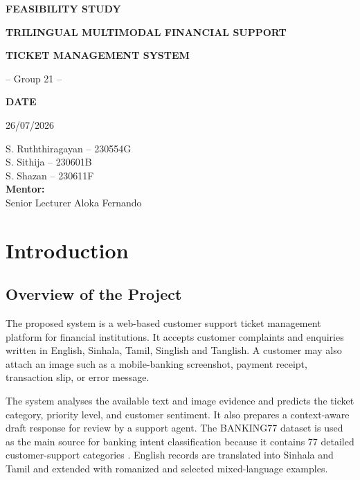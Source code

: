 \documentclass[11pt,a4paper]{article}
\begin{document}
\begin{titlepage}
\thispagestyle{empty}
\centering
\vspace*{3.8cm}

{\LARGE\bfseries FEASIBILITY STUDY\par}
\vspace{0.45cm}
{\Large\bfseries TRILINGUAL MULTIMODAL FINANCIAL SUPPORT\par}
{\Large\bfseries TICKET MANAGEMENT SYSTEM\par}
\vspace{0.35cm}
{\large -- Group 21 --\par}

\vfill

{\large\bfseries DATE\par}
{\large 26/07/2026\par}

\vfill

\begin{flushleft}
\large
S. Ruththiragayan -- 230554G\\
S. Sithija -- 230601B\\
S. Shazan -- 230611F\\[0.7cm]
\textbf{Mentor:}\\
Senior Lecturer Aloka Fernando
\end{flushleft}
\end{titlepage}

\setcounter{page}{1}
\tableofcontents
\clearpage

\section{Introduction}

\subsection{Overview of the Project}

The proposed system is a web-based customer support ticket management platform for financial institutions. It accepts customer complaints and enquiries written in English, Sinhala, Tamil, Singlish and Tanglish. A customer may also attach an image such as a mobile-banking screenshot, payment receipt, transaction slip, or error message.

The system analyses the available text and image evidence and predicts the ticket category, priority level, and customer sentiment. It also prepares a context-aware draft response for review by a support agent. The BANKING77 dataset is used as the main source for banking intent classification because it contains 77 detailed customer-support categories \cite{banking77}. English records are translated into Sinhala and Tamil and extended with romanized and selected mixed-language examples.
\end{document}

